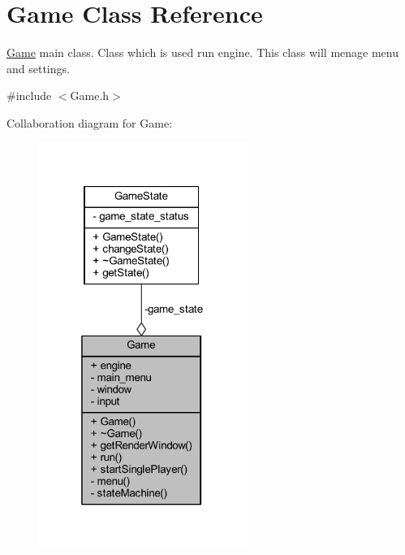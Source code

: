 \hypertarget{class_game}{}\section{Game Class Reference}
\label{class_game}


\hyperlink{class_game}{Game} main class. Class which is used run engine. This class will menage menu and settings.  




{\ttfamily \#include $<$Game.\+h$>$}



Collaboration diagram for Game\+:\nopagebreak
\begin{figure}[H]
\begin{center}
\leavevmode
\includegraphics[width=193pt]{class_game__coll__graph}
\end{center}
\end{figure}
